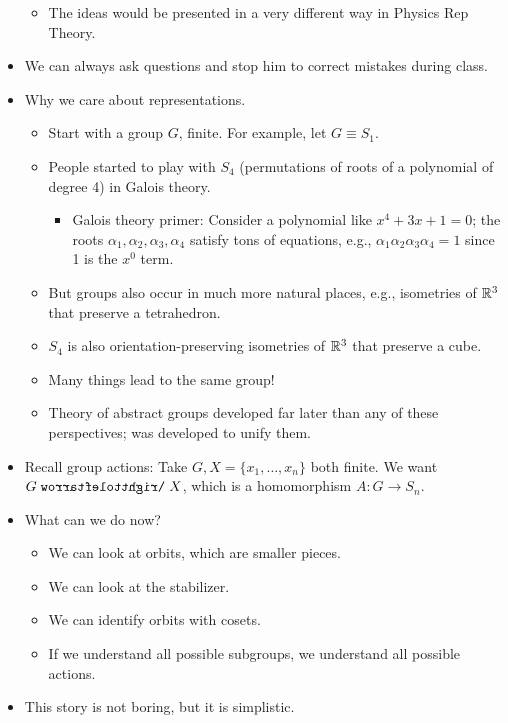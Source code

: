 \documentclass[../notes.tex]{subfiles}
\begin{document}
\begin{itemize}
    \begin{itemize}
        \item The ideas would be presented in a very different way in Physics Rep Theory.
    \end{itemize}
    \item We can always ask questions and stop him to correct mistakes during class.
    \item Why we care about representations.
    \begin{itemize}
        \item Start with a group $G$, finite. For example, let $G\equiv S_1$.
        \item People started to play with $S_4$ (permutations of roots of a polynomial of degree 4) in Galois theory.
        \begin{itemize}
            \item Galois theory primer: Consider a polynomial like $x^4+3x+1=0$; the roots $\alpha_1,\alpha_2,\alpha_3,\alpha_4$ satisfy tons of equations, e.g., $\alpha_1\alpha_2\alpha_3\alpha_4=1$ since 1 is the $x^0$ term.
        \end{itemize}
        \item But groups also occur in much more natural places, e.g., isometries of $\mathbb{R}^3$ that preserve a tetrahedron.
        \item $S_4$ is also orientation-preserving isometries of $\mathbb{R}^3$ that preserve a cube.
        \item Many things lead to the same group!
        \item Theory of abstract groups developed far later than any of these perspectives; was developed to unify them.
    \end{itemize}
    \item Recall group actions: Take $G,X=\{x_1,\dots,x_n\}$ both finite. We want $G\acts X$, which is a homomorphism $A:G\to S_n$.
    \item What can we do now?
    \begin{itemize}
        \item We can look at orbits, which are smaller pieces.
        \item We can look at the stabilizer.
        \item We can identify orbits with cosets.
        \item If we understand all possible subgroups, we understand all possible actions.
    \end{itemize}
    \item This story is not boring, but it is simplistic.

\end{itemize}
\end{document}
